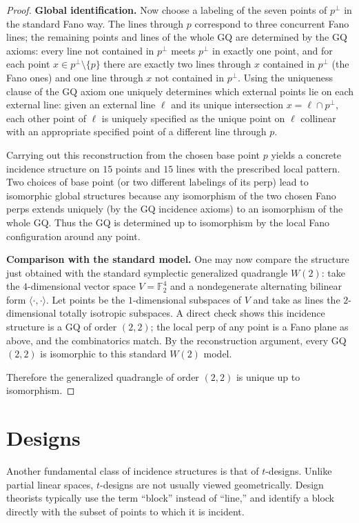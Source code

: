 \documentclass[12pt,a4paper,openany]{book}
\begin{document}
\begin{proof}
\medskip\noindent\textbf{Global identification.}
Now choose a labeling of the seven points of $p^\perp$ in the standard Fano way. The lines through $p$ correspond to three concurrent Fano lines; the remaining points and lines of the whole GQ are determined by the GQ axioms: every line not contained in $p^\perp$ meets $p^\perp$ in exactly one point, and for each point $x\in p^\perp\setminus\{p\}$ there are exactly two lines through $x$ contained in $p^\perp$ (the Fano ones) and one line through $x$ not contained in $p^\perp$. Using the uniqueness clause of the GQ axiom one uniquely determines which external points lie on each external line: given an external line $\ell$ and its unique intersection $x=\ell\cap p^\perp$, each other point of $\ell$ is uniquely specified as the unique point on $\ell$ collinear with an appropriate specified point of a different line through $p$.

Carrying out this reconstruction from the chosen base point $p$ yields a concrete incidence structure on $15$ points and $15$ lines with the prescribed local pattern. Two choices of base point (or two different labelings of its perp) lead to isomorphic global structures because any isomorphism of the two chosen Fano perps extends uniquely (by the GQ incidence axioms) to an isomorphism of the whole GQ. Thus the GQ is determined up to isomorphism by the local Fano configuration around any point.

\medskip\noindent\textbf{Comparison with the standard model.}
One may now compare the structure just obtained with the standard symplectic generalized quadrangle $W(2)$: take the $4$-dimensional vector space $V=\mathbb F_2^4$ and a nondegenerate alternating bilinear form $\langle\cdot,\cdot\rangle$. Let points be the $1$-dimensional subspaces of $V$ and take as lines the $2$-dimensional totally isotropic subspaces. A direct check shows this incidence structure is a GQ of order $(2,2)$; the local perp of any point is a Fano plane as above, and the combinatorics match. By the reconstruction argument, every GQ$(2,2)$ is isomorphic to this standard $W(2)$ model.

Therefore the generalized quadrangle of order $(2,2)$ is unique up to isomorphism.
\end{proof}







\section{Designs}
Another fundamental class of incidence structures is that of $t$-designs. 
Unlike partial linear spaces, $t$-designs are not usually viewed geometrically. 
Design theorists typically use the term ``block'' instead of ``line,'' and identify a block directly with the subset of points to which it is incident.
\end{document}
